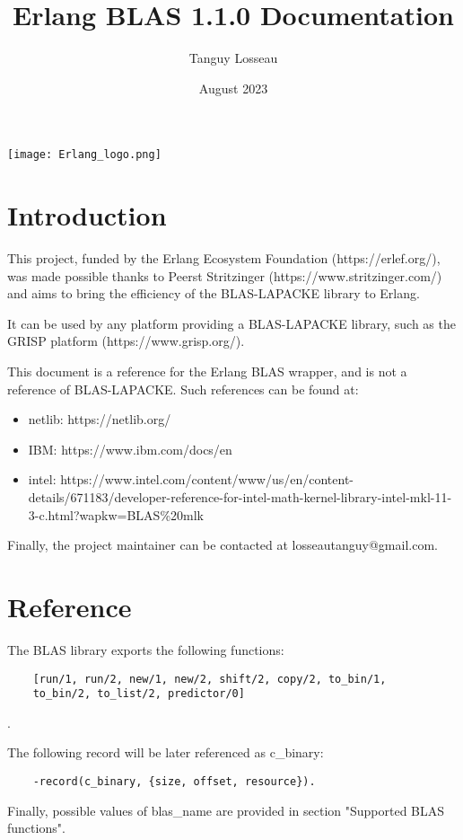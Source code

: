 \documentclass{article}
\title{Erlang BLAS 1.1.0 Documentation}
\author{Tanguy Losseau}
\date{August 2023}
\begin{document}
\maketitle

\texttt{[image: Erlang\_logo.png]}


\section{Introduction}
This project, funded by the Erlang Ecosystem Foundation (https://erlef.org/), was made possible thanks to Peerst Stritzinger (https://www.stritzinger.com/)
and aims to bring the efficiency of the BLAS-LAPACKE library to Erlang.\newline

It can be used by any platform providing a BLAS-LAPACKE library, such as the GRISP platform (https://www.grisp.org/).\newline

This document is a reference for the Erlang BLAS wrapper, and is not a reference of BLAS-LAPACKE. Such references can be found at:
\begin{itemize}
    \item netlib: https://netlib.org/
    \item IBM: https://www.ibm.com/docs/en
    \item intel: https://www.intel.com/content/www/us/en/content-details/671183/developer-reference-for-intel-math-kernel-library-intel-mkl-11-3-c.html?wapkw=BLAS\%20mlk
\end{itemize}

Finally, the project maintainer can be contacted at losseautanguy@gmail.com.

\section{Reference}
The BLAS library exports the following functions:
\begin{verbatim}
    [run/1, run/2, new/1, new/2, shift/2, copy/2, to_bin/1,
    to_bin/2, to_list/2, predictor/0]
\end{verbatim}.

The following record will be later referenced as c\_binary:
\begin{verbatim}
    -record(c_binary, {size, offset, resource}).
\end{verbatim}

Finally, possible values of blas\_name are provided in section "Supported BLAS functions".
    
\end{document}
